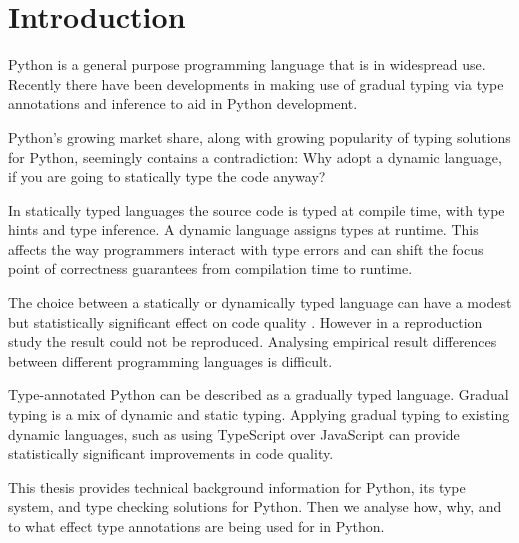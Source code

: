 \chapter{Introduction\label{intro}}


Python is a general purpose programming language that is in widespread use. Recently there have been developments in making use of gradual typing via type annotations and inference to aid in Python development.

Python's growing market share, along with growing popularity of typing solutions for Python, seemingly contains a contradiction: Why adopt a dynamic language, if you are going to statically type the code anyway?

In statically typed languages the source code is typed at compile time, with type hints and type inference. A dynamic language assigns types at runtime. This affects the way programmers interact with type errors and can shift the focus point of correctness guarantees from compilation time to  runtime.

The choice between a statically or dynamically typed language can have a modest but statistically significant effect on code quality \cite{ray_codequality_2014}.
However in a reproduction study \cite{codequality_reproudction_2019} the result could not be reproduced. Analysing empirical result differences between different programming languages is difficult.

Type-annotated Python can be described as a gradually typed language. Gradual typing is a mix of dynamic and static typing. Applying gradual typing to existing dynamic languages, such as using TypeScript over JavaScript can provide statistically significant improvements in code quality. %

This thesis provides technical background information for Python, its type system, and type checking solutions for Python. Then we analyse how, why, and to what effect type annotations are being used for in Python.


